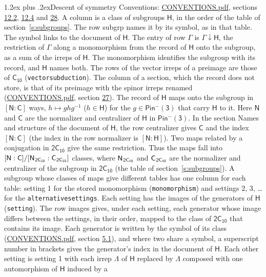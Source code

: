 \documentclass[10pt,a4paper]{article}
\makeatletter
\renewcommand\section{\@startsection{section}{1}{\z@}{-3ex plus -1ex minus -.2ex}%
  {1.2ex plus .2ex}{\normalfont\large\sffamily\bfseries\color{parttitle}}}
\numberwithin{equation}{section}
\newcommand{\grp}[1]{\mathsf{#1}}
\newcommand{\grpindex}[2]{[#1 : #2]}
\newcommand{\restr}[2]{#1\!\downarrow#2}
\newcommand{\hairsp}{\mkern1mu}
\makeatother
\begin{document}
\section{Descent of symmetry}\label{s:subduction}
Conventions: \href{../../CONVENTIONS.pdf}{CONVENTIONS.pdf}, sections \href{../../../rotation/CONVENTIONS.pdf\#conv.12.2}{12.2}, \href{../../../rotation/CONVENTIONS.pdf\#conv.12.4}{12.4} and \href{../../CONVENTIONS.pdf\#conv.28}{28}.
A column is a class of subgroups $\grp{H}$, in the order of the table of section~\ref{s:subgroups}. The row subgrp names it by its symbol, as in that table. The symbol links to the document of $\grp{H}$. The entry of row $\Gamma$ is $\restr{\Gamma}{\grp{H}}$, the restriction of $\Gamma$ along a monomorphism from the record of $\grp{H}$ onto the subgroup, as a sum of the irreps of $\grp{H}$. The monomorphism identifies the subgroup with its record, and $\grp{H}$ names both. The rows of the vector irreps of a preimage are those of \href{../../../rotation/data/pdf/C10.pdf}{$\grp{C_{10}}$} (\texttt{vectorsubduction}). The column of a section, which the record does not store, is that of its preimage with the spinor irreps renamed (\href{../../CONVENTIONS.pdf}{CONVENTIONS.pdf}, section \href{../../CONVENTIONS.pdf\#conv.27}{27}). \label{n:group.normalizer.o3}\label{n:group.centralizer.o3}\label{n:element.h}The record of $\grp{H}$ maps onto the subgroup in $\grpindex{\grp{N}}{\grp{C}}$ ways, $h \mapsto g h g^{-1}$ ($h \in \grp{H}$) for the $g \in \grp{Pin^{-}(3)}$ that carry $\grp{H}$ to it. Here $\grp{N}$ and $\grp{C}$ are the normalizer and centralizer of $\grp{H}$ in \href{Pinminus3.pdf}{$\grp{Pin^{-}(3)}$}. In the section Names and structure of the document of $\grp{H}$, the row centralizer gives $\grp{C}$ and the index $\grpindex{\grp{N}}{\grp{C}}$ (the index in the row normalizer is $\grpindex{\grp{N}}{\grp{H}}$). Two maps related by a conjugation in $\grp{2C_{10}}$ give the same restriction. Thus the maps fall into $\grpindex{\grp{N}}{\grp{C}}/\grpindex{\grp{N}_{\hairsp \grp{2C_{10}}}}{\grp{C}_{\hairsp \grp{2C_{10}}}}$ classes, where $\grp{N}_{\hairsp \grp{2C_{10}}}$ and $\grp{C}_{\hairsp \grp{2C_{10}}}$ are the normalizer and centralizer of the subgroup in $\grp{2C_{10}}$ (the table of section~\ref{s:subgroups}). \label{n:head.setting}A subgroup whose classes of maps give different tables has one column for each table: setting 1 for the stored monomorphism (\texttt{monomorphism}) and settings 2, 3, \dots{} for the \texttt{alternativesettings}. Each setting has the images of the generators of $\grp{H}$ (\texttt{setting}). \label{n:head.images}The row images gives, under each setting, each generator whose image differs between the settings, in their order, mapped to the class of $\grp{2C_{10}}$ that contains its image. Each generator is written by the symbol of its class (\href{../../CONVENTIONS.pdf}{CONVENTIONS.pdf}, section \href{../../../rotation/CONVENTIONS.pdf\#conv.5.1}{5.1}), and where two share a symbol, a superscript number in brackets gives the generator's index in the document of $\grp{H}$. \label{n:irrep.Delta}Each other setting is setting 1 with each irrep $\Lambda$ of $\grp{H}$ replaced by $\Lambda$ composed with one automorphism of $\grp{H}$ induced by a 
\end{document}
